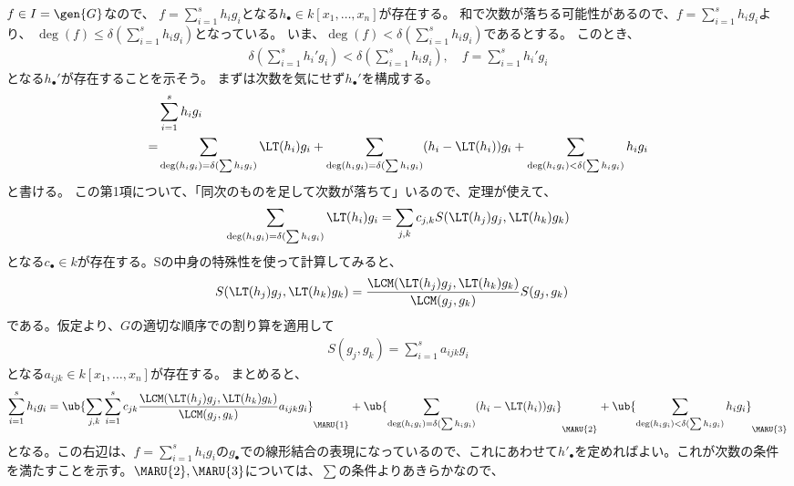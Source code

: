 \begin{myproof}
\begin{itemize}
    $f\in I=\gen{G}$なので、
    $f = \sum_{i=1}^s h_i g_i$となる$h_\bullet \in k[x_1,\dots,x_n]$が存在する。
    和で次数が落ちる可能性があるので、$f=\sum_{i=1}^s h_i g_i$より、
    $\deg(f)\le \delta(\sum_{i=1}^s h_i g_i)$となっている。
    いま、$\deg(f) < \delta(\sum_{i=1}^s h_i g_i)$であるとする。
    このとき、
    \begin{align}
      \delta(\sum_{i=1}^s h_i' g_i) < \delta(\sum_{i=1}^s h_i g_i),\quad
      f = \sum_{i=1}^s h_i' g_i
    \end{align}
    となる$h_\bullet'$が存在することを示そう。
    まずは次数を気にせず$h_\bullet'$を構成する。
    \begin{align}
      & \sum_{i=1}^s h_i g_i \\
      =&
      \sum_{\deg(h_ig_i)= \delta(\sum h_i g_i)} \LT(h_i)g_i
      +
      \sum_{\deg(h_i g_i)=\delta(\sum h_i g_i)} (h_i - \LT(h_i))g_i
      +
      \sum_{\deg(h_ig_i) < \delta(\sum h_i g_i)} h_i g_i
    \end{align}
    と書ける。
    この第1項について、「同次のものを足して次数が落ちて」いるので、定理が使えて、
    \begin{align}
      \sum_{\deg(h_ig_i)=\delta(\sum h_i g_i)} \LT(h_i)g_i
       =
       \sum_{j,k} c_{j,k}S(\LT(h_j)g_j, \LT(h_k)g_k)
    \end{align}
    となる$c_\bullet \in k$が存在する。Sの中身の特殊性を使って計算してみると、
    \begin{align}
      S(\LT(h_j)g_j, \LT(h_k)g_k)
      &=
      \frac{\LCM(\LT(h_j)g_j, \LT(h_k)g_k)}{\LCM(g_j,g_k)} S(g_j,g_k)
    \end{align}
    である。仮定より、$G$の適切な順序での割り算を適用して
    \begin{align}
      S(g_j,g_k) = \sum_{i=1}^s a_{ijk}g_i
    \end{align}
    となる$a_{ijk}\in k[x_1,\dots,x_n]$が存在する。
    まとめると、
    \begin{align}
      \sum_{i=1}^s h_i g_i
      =
      \ub{\sum_{j,k}\sum_{i=1}^s c_{jk}\frac{\LCM(\LT(h_j)g_j, \LT(h_k)g_k)}{\LCM(g_j,g_k)} a_{ijk}g_i}_{\MARU{1}}
      +
      \ub{\sum_{\deg(h_i g_i)=\delta(\sum h_i g_i)} (h_i - \LT(h_i))g_i}_{\MARU{2}}
      +
      \ub{\sum_{\deg(h_ig_i) < \delta(\sum h_i g_i)} h_i g_i}_{\MARU{3}}
    \end{align}
    となる。この右辺は、$f=\sum_{i=1}^s h_i g_i$の$g_\bullet$での線形結合の表現になっているので、これにあわせて$h'_\bullet$を定めればよい。これが次数の条件を満たすことを示す。$\MARU{2},\MARU{3}$については、$\sum$の条件よりあきらかなので、

\end{itemize}
\end{myproof}
